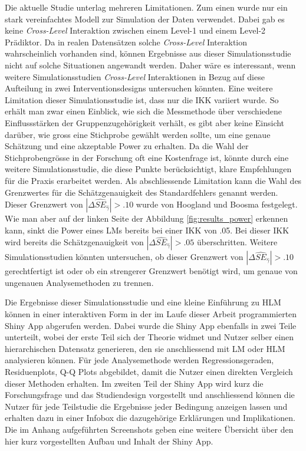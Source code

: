 \documentclass[12pt]{article}\usepackage[]{graphicx}\usepackage[]{color}
\begin{document}
Die aktuelle Studie unterlag mehreren Limitationen. Zum einen wurde nur ein stark vereinfachtes Modell zur Simulation der Daten verwendet. Dabei gab es keine \textit{Cross-Level} Interaktion zwischen einem Level-1 und einem Level-2 Prädiktor. Da in realen Datensätzen solche \textit{Cross-Level} Interaktion wahrscheinlich vorhanden sind, können Ergebnisse aus dieser Simulationsstudie nicht auf solche Situationen angewandt werden. Daher wäre es interessant, wenn weitere Simulationsstudien \textit{Cross-Level} Interaktionen in Bezug auf diese Aufteilung in zwei Interventionsdesigns untersuchen könnten. Eine weitere Limitation dieser Simulationsstudie ist, dass nur die IKK variiert wurde. So erhält man zwar einen Einblick, wie sich die Messmethode über verschiedene Einflussstärken der Gruppenzugehörigkeit verhält, es gibt aber keine Einsicht darüber, wie gross eine Stichprobe gewählt werden sollte, um eine genaue Schätzung und eine akzeptable Power zu erhalten. Da die Wahl der Stichprobengrösse in der Forschung oft eine Kostenfrage ist, könnte durch eine weitere Simulationsstudie, die diese Punkte berücksichtigt, klare Empfehlungen für die Praxis erarbeitet werden. Als abschliessende Limitation kann die Wahl des Grenzwertes für die Schätzgenauigkeit des Standardfehlers genannt werden. Dieser Grenzwert von $|\Delta\widehat{SE}_{\widehat{\gamma}}| > .10$ wurde von Hoogland und Boosma \citeyearpar{hooglandboosma1998robustness} festgelegt. Wie man aber auf der linken Seite der Abbildung \ref{fig:results_power} erkennen kann, sinkt die Power eines LMs bereits bei einer IKK von .05. Bei dieser IKK wird bereits die Schätzgenauigkeit von $|\Delta\widehat{SE}_{\widehat{\gamma}}| > .05$ überschritten. Weitere Simulationsstudien könnten untersuchen, ob dieser Grenzwert von $|\Delta\widehat{SE}_{\widehat{\gamma}}| > .10$ gerechtfertigt ist oder ob ein strengerer Grenzwert benötigt wird, um genaue von ungenauen Analysemethoden zu trennen.

Die Ergebnisse dieser Simulationsstudie und eine kleine Einführung zu HLM können in einer interaktiven Form in der im Laufe dieser Arbeit programmierten Shiny App abgerufen werden. Dabei wurde die Shiny App ebenfalls in zwei Teile unterteilt, wobei der erste Teil sich der Theorie widmet und Nutzer selber einen hierarchischen Datensatz generieren, den sie anschliessend mit LM oder HLM analysieren können. Für jede Analysemethode werden Regressionsgeraden, Residuenplots, Q-Q Plots abgebildet, damit die Nutzer einen direkten Vergleich dieser Methoden erhalten. Im zweiten Teil der Shiny App wird kurz die Forschungsfrage und das Studiendesign vorgestellt und anschliessend können die Nutzer für jede Teilstudie die Ergebnisse jeder Bedingung anzeigen lassen und erhalten dazu in einer Infobox die dazugehörige Erklärungen und Implikationen. Die im Anhang aufgeführten Screenshots geben eine weitere Übersicht über den hier kurz vorgestellten Aufbau und Inhalt der Shiny App.
\end{document}
